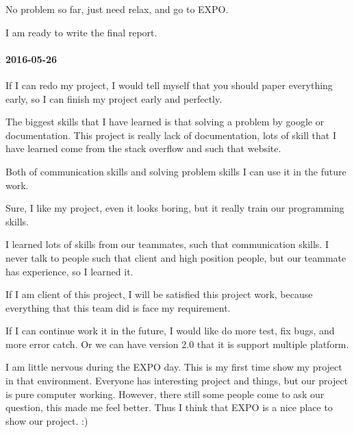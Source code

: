 No problem so far, just need relax, and go to EXPO.


I am ready to write the final report.

\paragraph{2016-05-26}
If I can redo my project, I would tell myself that you should paper everything early, so I can finish my project early and perfectly.


The biggest skills that I have learned is that solving a problem by google or documentation. This project is really lack of documentation, lots of skill that I have learned come from the stack overflow and such that website.


Both of communication skills and solving problem skills I can use it in the future work.


Sure, I like my project, even it looks boring, but it really train our programming skills.


I learned lots of skills from our teammates, such that communication skills. I never talk to people such that client and high position people, but our teammate has experience, so I learned it.


If I am client of this project, I will be satisfied this project work, because everything that this team did is face my requirement.


If I can continue work it in the future, I would like do more test, fix bugs, and more error catch. Or we can have version 2.0 that it is support multiple platform.


I am little nervous during the EXPO day. This is my first time show my project in that environment. Everyone has interesting project and things, but our project is pure computer working. However, there still some people come to ask our question, this made me feel better. Thus I think that EXPO is a nice place to show our project. :)
